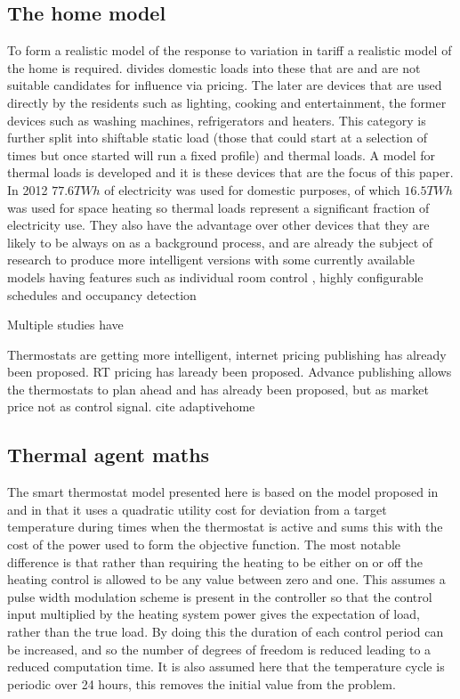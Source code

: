 \documentclass[a4paper, 10 pt, conference]{ieeeconf}  %
\begin{document}
\subsection{The home model}
To form a realistic model of the response to variation in tariff a realistic model of the home is required. \cite{ramchurn2011agent} divides domestic loads into these that are and are not suitable candidates for influence via pricing. The later are devices that are used directly by the residents such as lighting, cooking and entertainment, the former devices such as washing machines, refrigerators and heaters. This category is further split into shiftable static load (those that could start at a selection of times but once started will run a fixed profile) and thermal loads. A model for thermal loads is developed and it is these devices that are the focus of this paper. In 2012 $77.6 TWh$ of electricity was used for domestic purposes, of which $16.5 TWh$ was used for space heating \cite{ecuk_data} so thermal loads represent a significant fraction of electricity use. They also have the advantage over other devices that they are likely to be always on as a background process, and are already the subject of research to produce more intelligent versions \cite{rogers2011adaptive} \cite{ramchurn2013agentswitch} with some currently available models having features such as individual room control \cite{honeywell}, highly configurable schedules \cite{nest} and occupancy detection \cite{tado}

Multiple studies have 

Thermostats are getting more intelligent, internet pricing publishing has already been proposed. RT pricing has laready been proposed. Advance publishing allows the thermostats to plan ahead and has already been proposed, but as market price not as control signal. cite adaptivehome
\subsection{Thermal agent maths}

The smart thermostat model presented here is based on the model proposed in and in that it uses a quadratic utility cost for deviation from a target temperature during times when the thermostat is active and sums this with the cost of the power used to form the objective function. The most notable difference is that rather than requiring the heating to be either on or off the heating control is allowed to be any value between zero and one. This assumes a pulse width modulation scheme is present in the controller so that the control input multiplied by the heating system power gives the expectation of load, rather than the true load. By doing this the duration of each control period can be increased, and so the number of degrees of freedom is reduced leading to a reduced computation time. It is also assumed here that the temperature cycle is periodic over 24 hours, this removes the initial value from the problem.
\end{document}
